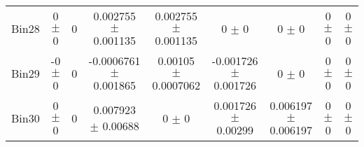 \begin{tabular}{@{\extracolsep{4pt}}lcccccccc@{}}
     Bin28 & 0 $\pm$ 0 & 0 & 0.002755 $\pm$ 0.001135 & 0.002755 $\pm$ 0.001135 & 0 $\pm$ 0 & 0 $\pm$ 0 & 0 $\pm$ 0 & 0 $\pm$ 0 \\ 
     Bin29 & -0 $\pm$ 0 & 0 & -0.0006761 $\pm$ 0.001865 & 0.00105 $\pm$ 0.0007062 & -0.001726 $\pm$ 0.001726 & 0 $\pm$ 0 & 0 $\pm$ 0 & 0 $\pm$ 0 \\ 
     Bin30 & 0 $\pm$ 0 & 0 & 0.007923 $\pm$ 0.00688 & 0 $\pm$ 0 & 0.001726 $\pm$ 0.00299 & 0.006197 $\pm$ 0.006197 & 0 $\pm$ 0 & 0 $\pm$ 0 \\ 
\hline\hline
  \end{tabular}
